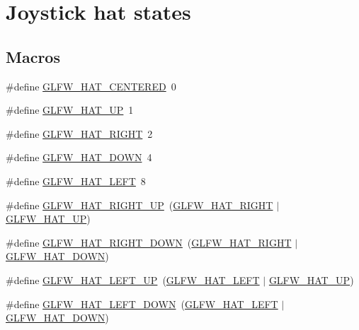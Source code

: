 \hypertarget{group__hat__state}{}\section{Joystick hat states}
\label{group__hat__state}
\subsection*{Macros}
\begin{DoxyCompactItemize}
\item 
\#define \mbox{\hyperlink{group__hat__state_gae2c0bcb7aec609e4736437554f6638fd}{G\+L\+F\+W\+\_\+\+H\+A\+T\+\_\+\+C\+E\+N\+T\+E\+R\+ED}}~0
\item 
\#define \mbox{\hyperlink{group__hat__state_ga8c9720c76cd1b912738159ed74c85b36}{G\+L\+F\+W\+\_\+\+H\+A\+T\+\_\+\+UP}}~1
\item 
\#define \mbox{\hyperlink{group__hat__state_ga252586e3bbde75f4b0e07ad3124867f5}{G\+L\+F\+W\+\_\+\+H\+A\+T\+\_\+\+R\+I\+G\+HT}}~2
\item 
\#define \mbox{\hyperlink{group__hat__state_gad60d1fd0dc85c18f2642cbae96d3deff}{G\+L\+F\+W\+\_\+\+H\+A\+T\+\_\+\+D\+O\+WN}}~4
\item 
\#define \mbox{\hyperlink{group__hat__state_gac775f4b3154fdf5db93eb432ba546dff}{G\+L\+F\+W\+\_\+\+H\+A\+T\+\_\+\+L\+E\+FT}}~8
\item 
\#define \mbox{\hyperlink{group__hat__state_ga94aea0ae241a8b902883536c592ee693}{G\+L\+F\+W\+\_\+\+H\+A\+T\+\_\+\+R\+I\+G\+H\+T\+\_\+\+UP}}~(\mbox{\hyperlink{group__hat__state_ga252586e3bbde75f4b0e07ad3124867f5}{G\+L\+F\+W\+\_\+\+H\+A\+T\+\_\+\+R\+I\+G\+HT}} $\vert$ \mbox{\hyperlink{group__hat__state_ga8c9720c76cd1b912738159ed74c85b36}{G\+L\+F\+W\+\_\+\+H\+A\+T\+\_\+\+UP}})
\item 
\#define \mbox{\hyperlink{group__hat__state_gad7f0e4f52fd68d734863aaeadab3a3f5}{G\+L\+F\+W\+\_\+\+H\+A\+T\+\_\+\+R\+I\+G\+H\+T\+\_\+\+D\+O\+WN}}~(\mbox{\hyperlink{group__hat__state_ga252586e3bbde75f4b0e07ad3124867f5}{G\+L\+F\+W\+\_\+\+H\+A\+T\+\_\+\+R\+I\+G\+HT}} $\vert$ \mbox{\hyperlink{group__hat__state_gad60d1fd0dc85c18f2642cbae96d3deff}{G\+L\+F\+W\+\_\+\+H\+A\+T\+\_\+\+D\+O\+WN}})
\item 
\#define \mbox{\hyperlink{group__hat__state_ga638f0e20dc5de90de21a33564e8ce129}{G\+L\+F\+W\+\_\+\+H\+A\+T\+\_\+\+L\+E\+F\+T\+\_\+\+UP}}~(\mbox{\hyperlink{group__hat__state_gac775f4b3154fdf5db93eb432ba546dff}{G\+L\+F\+W\+\_\+\+H\+A\+T\+\_\+\+L\+E\+FT}}  $\vert$ \mbox{\hyperlink{group__hat__state_ga8c9720c76cd1b912738159ed74c85b36}{G\+L\+F\+W\+\_\+\+H\+A\+T\+\_\+\+UP}})
\item 
\#define \mbox{\hyperlink{group__hat__state_ga76c02baf1ea345fcbe3e8ff176a73e19}{G\+L\+F\+W\+\_\+\+H\+A\+T\+\_\+\+L\+E\+F\+T\+\_\+\+D\+O\+WN}}~(\mbox{\hyperlink{group__hat__state_gac775f4b3154fdf5db93eb432ba546dff}{G\+L\+F\+W\+\_\+\+H\+A\+T\+\_\+\+L\+E\+FT}}  $\vert$ \mbox{\hyperlink{group__hat__state_gad60d1fd0dc85c18f2642cbae96d3deff}{G\+L\+F\+W\+\_\+\+H\+A\+T\+\_\+\+D\+O\+WN}})
\end{DoxyCompactItemize}


